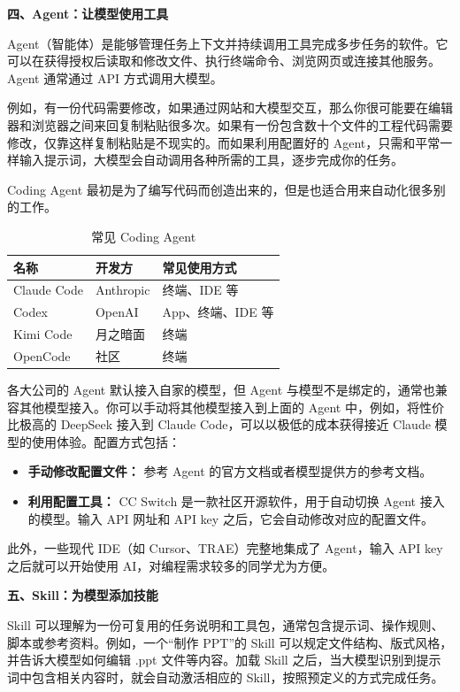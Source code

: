 \textbf{四、Agent：让模型使用工具}

Agent（智能体）是能够管理任务上下文并持续调用工具完成多步任务的软件。它可以在获得授权后读取和修改文件、执行终端命令、浏览网页或连接其他服务。Agent 通常通过 API 方式调用大模型。

例如，有一份代码需要修改，如果通过网站和大模型交互，那么你很可能要在编辑器和浏览器之间来回复制粘贴很多次。如果有一份包含数十个文件的工程代码需要修改，仅靠这样复制粘贴是不现实的。而如果利用配置好的 Agent，只需和平常一样输入提示词，大模型会自动调用各种所需的工具，逐步完成你的任务。

Coding Agent 最初是为了编写代码而创造出来的，但是也适合用来自动化很多别的工作。

\begin{table}[htbp]
\centering
\begin{tabular}{lll}
\hline
名称 & 开发方 & 常见使用方式 \\
\hline
Claude Code & Anthropic & 终端、IDE 等 \\
Codex & OpenAI & App、终端、IDE 等 \\
Kimi Code & 月之暗面 & 终端 \\
OpenCode & 社区 & 终端 \\
\hline
\end{tabular}
\caption{常见 Coding Agent}
\end{table}

各大公司的 Agent 默认接入自家的模型，但 Agent 与模型不是绑定的，通常也兼容其他模型接入。你可以手动将其他模型接入到上面的 Agent 中，例如，将性价比极高的 DeepSeek 接入到 Claude Code，可以以极低的成本获得接近 Claude 模型的使用体验。配置方式包括：

\begin{itemize}
    \item \textbf{手动修改配置文件：} 参考 Agent 的官方文档或者模型提供方的参考文档。
    \item \textbf{利用配置工具：} CC Switch 是一款社区开源软件，用于自动切换 Agent 接入的模型。输入 API 网址和 API key 之后，它会自动修改对应的配置文件。
\end{itemize}

此外，一些现代 IDE（如 Cursor、TRAE）完整地集成了 Agent，输入 API key 之后就可以开始使用 AI，对编程需求较多的同学尤为方便。

\vspace{10pt}

\textbf{五、Skill：为模型添加技能}

Skill 可以理解为一份可复用的任务说明和工具包，通常包含提示词、操作规则、脚本或参考资料。例如，一个“制作 PPT”的 Skill 可以规定文件结构、版式风格，并告诉大模型如何编辑 .ppt 文件等内容。加载 Skill 之后，当大模型识别到提示词中包含相关内容时，就会自动激活相应的 Skill，按照预定义的方式完成任务。

